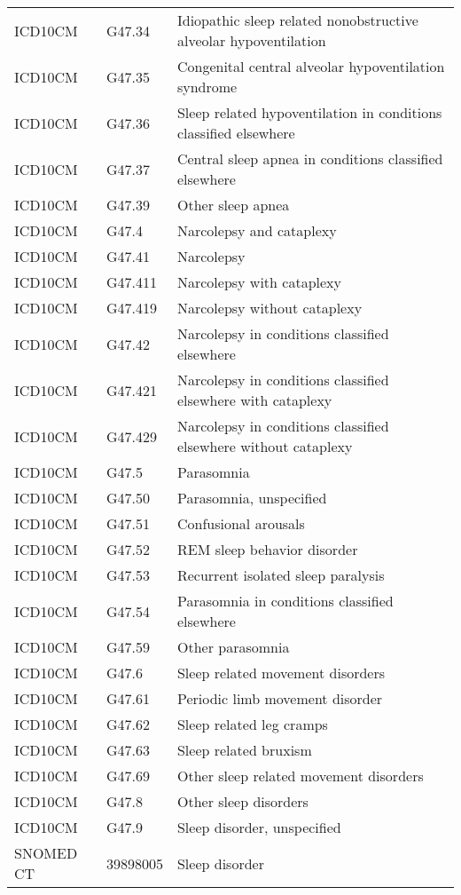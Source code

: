 \begin{longtable}{p{}p{}p{}}
  ICD10CM & G47.34 & Idiopathic sleep related nonobstructive alveolar hypoventilation \\ 
  ICD10CM & G47.35 & Congenital central alveolar hypoventilation syndrome \\ 
  ICD10CM & G47.36 & Sleep related hypoventilation in conditions classified elsewhere \\ 
  ICD10CM & G47.37 & Central sleep apnea in conditions classified elsewhere \\ 
  ICD10CM & G47.39 & Other sleep apnea \\ 
  ICD10CM & G47.4 & Narcolepsy and cataplexy \\ 
  ICD10CM & G47.41 & Narcolepsy \\ 
  ICD10CM & G47.411 & Narcolepsy with cataplexy \\ 
  ICD10CM & G47.419 & Narcolepsy without cataplexy \\ 
  ICD10CM & G47.42 & Narcolepsy in conditions classified elsewhere \\ 
  ICD10CM & G47.421 & Narcolepsy in conditions classified elsewhere with cataplexy \\ 
  ICD10CM & G47.429 & Narcolepsy in conditions classified elsewhere without cataplexy \\ 
  ICD10CM & G47.5 & Parasomnia \\ 
  ICD10CM & G47.50 & Parasomnia, unspecified \\ 
  ICD10CM & G47.51 & Confusional arousals \\ 
  ICD10CM & G47.52 & REM sleep behavior disorder \\ 
  ICD10CM & G47.53 & Recurrent isolated sleep paralysis \\ 
  ICD10CM & G47.54 & Parasomnia in conditions classified elsewhere \\ 
  ICD10CM & G47.59 & Other parasomnia \\ 
  ICD10CM & G47.6 & Sleep related movement disorders \\ 
  ICD10CM & G47.61 & Periodic limb movement disorder \\ 
  ICD10CM & G47.62 & Sleep related leg cramps \\ 
  ICD10CM & G47.63 & Sleep related bruxism \\ 
  ICD10CM & G47.69 & Other sleep related movement disorders \\ 
  ICD10CM & G47.8 & Other sleep disorders \\ 
  ICD10CM & G47.9 & Sleep disorder, unspecified \\ 
  SNOMED CT & 39898005 & Sleep disorder \\ 

\end{longtable}
